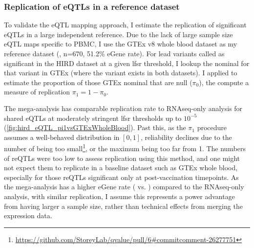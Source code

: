 \subsubsection{Replication of eQTLs in a reference dataset}

To validate the \gls{eQTL} mapping approach, I estimate the replication of significant eQTLs in a large independent reference.
Due to the lack of large sample size \gls{eQTL} maps specific to \gls{PBMC}, I use the GTEx v8 whole blood dataset as my reference dataset (\autocite{thegtexconsortium2020GTExConsortiumAtlas}, n=670, 51.2\% eGene rate).
For lead variants called as significant in the \gls{HIRD} dataset at a given lfsr threshold, I lookup the nominal \pvalue{} for that variant in GTEx (where the variant exists in both datasets).
I applied  to estimate the proportion of those GTEx nominal \pvalues{} that are null ($\pi_0$), the compute a measure of replication $\pi_1 = 1 - \pi_0$.

The mega-analysis has comparable replication rate to \gls{RNAseq}-only analysis for shared \glspl{eQTL} at moderately stringent \gls{lfsr} thresholds up to $10^{-5}$ (\cref{fig:hird_eQTL_pi1vsGTExWholeBlood}).
Past this, as the $\pi_1$ procedure assumes a well-behaved \pvalue distribution in $\left[0, 1\right]$, 
reliability declines due to the number of \pvalues{} being too small\footnote{\url{https://github.com/StoreyLab/qvalue/pull/6\#commitcomment-26277751}}, or the maximum \pvalue{} being too far from 1.
The numbers of \glspl{reQTL} were too low to assess replication using this method, and one might not expect them to replicate in a baseline dataset such as GTEx whole blood, especially for those \glspl{reQTL} significant only at post-vaccination timepoints.
As the mega-analysis has a higher eGene rate ( vs. ) compared to the \gls{RNAseq}-only analysis, with similar replication,
I assume this represents a power advantage from having larger a sample size, rather than technical effects from merging the expression data.

